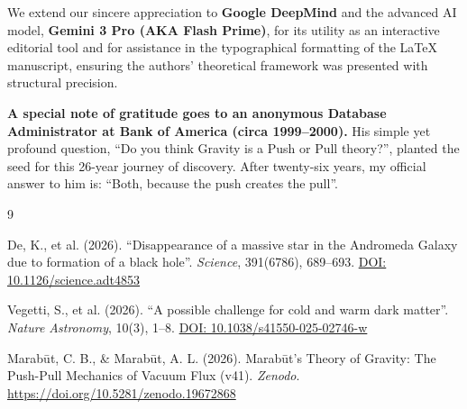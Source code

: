 \documentclass[11pt, a4paper]{article}
\newcommand{\doi}[1]{\href{https://doi.org/#1}{DOI: #1}}
\begin{document}
  We extend our sincere appreciation to \textbf{Google DeepMind} and the advanced AI model, \textbf{Gemini 3 Pro (AKA Flash Prime)}, for its utility as an interactive editorial tool and for assistance in the typographical formatting of the LaTeX manuscript, ensuring the authors' theoretical framework was presented with structural precision.

  \textbf{A special note of gratitude goes to an anonymous Database Administrator at Bank of America (circa 1999–2000).} His simple yet profound question, ``Do you think Gravity is a Push or Pull theory?'', planted the seed for this 26-year journey of discovery. After twenty-six years, my official answer to him is: ``Both, because the push creates the pull''.

\begin{thebibliography}{9}

  De, K., et al. (2026).
  ``Disappearance of a massive star in the Andromeda Galaxy due to formation of a black hole''.
  \textit{Science}, 391(6786), 689--693.
  \doi{10.1126/science.adt4853}

  Vegetti, S., et al. (2026).
  ``A possible challenge for cold and warm dark matter''.
  \textit{Nature Astronomy}, 10(3), 1--8.
  \doi{10.1038/s41550-025-02746-w}

  Marab\={u}t, C. B., \& Marab\={u}t, A. L. (2026).
  Marab\={u}t's Theory of Gravity: The Push-Pull Mechanics of Vacuum Flux (v41). \textit{Zenodo}.
  \url{https://doi.org/10.5281/zenodo.19672868}

\end{thebibliography}
\end{document}
